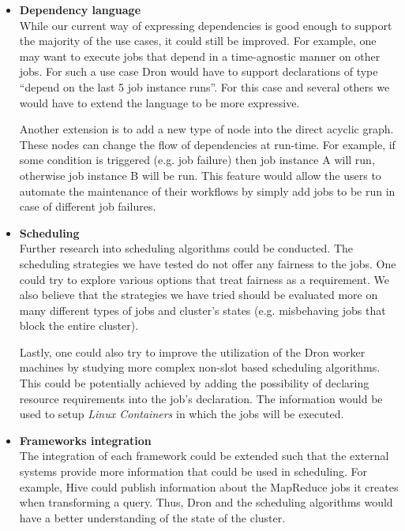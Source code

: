 \documentclass[11pt,a4paper,twoside]{report}
\begin{document}
\begin{itemize}
\item{\textbf{Dependency language}}\\
While our current way of expressing dependencies is good enough to support the majority of the use cases, it could still be improved. For example, one may want to execute jobs that depend in a time-agnostic manner on other jobs. For such a use case Dron would have to support declarations of type ``depend on the last 5 job instance runs''. For this case and several others we would have to extend the language to be more expressive.


Another extension is to add a new type of node into the direct acyclic graph. These nodes can change  the flow of dependencies at run-time. For example, if some condition is triggered (e.g. job failure) then job instance A will run, otherwise job instance B will be run. This feature would allow the users to automate the maintenance of their workflows by simply add jobs to be run in case of different job failures.

\item{\textbf{Scheduling}}\\
Further research into scheduling algorithms could be conducted. The scheduling strategies we have tested do not offer any fairness to the jobs. One could try to explore various options that treat fairness as a requirement. We also believe that the strategies we have tried should be evaluated more on many different types of jobs and cluster's states (e.g. misbehaving jobs that block the entire cluster).


Lastly, one could also try to improve the utilization of the Dron worker machines by studying more complex non-slot based scheduling algorithms. This could be potentially achieved by adding the possibility of declaring resource requirements into the job's declaration. The information would be used to setup \textit{Linux Containers} in which the jobs will be executed.

\item{\textbf{Frameworks integration}}\\
The integration of each framework could be extended such that the external systems provide more information that could be used in scheduling. For example, Hive could publish information about the MapReduce jobs it creates when transforming a query. Thus, Dron and the scheduling algorithms would have a better understanding of the state of the cluster.


\end{itemize}
\end{document}
